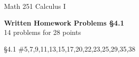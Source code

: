 \documentclass[11pt]{report}
\theoremstyle{plain}
\begin{document}
\hfill Math 251 Calculus I
\begin{center}
\Large{\textbf{Written Homework Problems \S 4.1}} \\
14 problems for 28 points\\
\end{center}

\begin{description}
\item{\S 4.1} \#5,7,9,11,13,15,17,20,22,23,25,29,35,38\\


\end{description}
\end{document}
